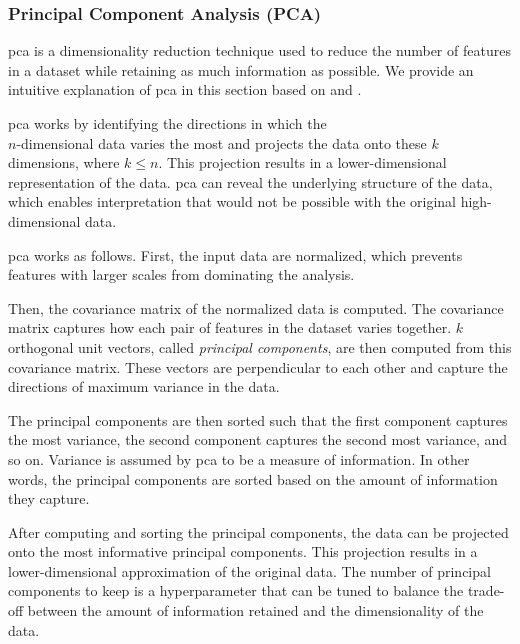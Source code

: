 \subsubsection{Principal Component Analysis (PCA)}\label{subsec:pca}
\gls{pca} is a dimensionality reduction technique used to reduce the number of features in a dataset while retaining as much information as possible. We provide an intuitive explanation of \gls{pca} in this section based on \citet{dataminingConcepts} and \citet{Vasques2024}.

\gls{pca} works by identifying the directions in which the\\$n$-dimensional data varies the most and projects the data onto these $k$ dimensions, where $k \leq n$. This projection results in a lower-dimensional representation of the data. \gls{pca} can reveal the underlying structure of the data, which enables interpretation that would not be possible with the original high-dimensional data.

\gls{pca} works as follows. First, the input data are normalized, which prevents features with larger scales from dominating the analysis.

Then, the covariance matrix of the normalized data is computed.
The covariance matrix captures how each pair of features in the dataset varies together.
$k$ orthogonal unit vectors, called \textit{principal components}, are then computed from this covariance matrix.
These vectors are perpendicular to each other and capture the directions of maximum variance in the data.

The principal components are then sorted such that the first component captures the most variance, the second component captures the second most variance, and so on. Variance is assumed by \gls{pca} to be a measure of information. In other words, the principal components are sorted based on the amount of information they capture.

After computing and sorting the principal components, the data can be projected onto the most informative principal components. This projection results in a lower-dimensional approximation of the original data. The number of principal components to keep is a hyperparameter that can be tuned to balance the trade-off between the amount of information retained and the dimensionality of the data.
